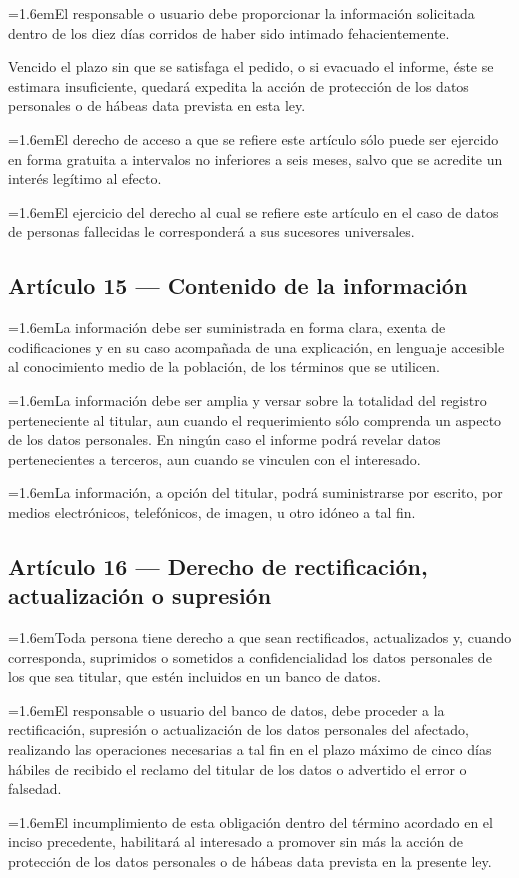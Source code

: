 \documentclass[10pt,a4paper]{article}
\newcommand{\articulo}[1]{\subsection{#1}}
\newcommand{\inciso}[2]{\par{\hangindent=1.6em\hangafter=1\makebox[1.6em][l]{#1}#2\par}}
\begin{document}
\inciso{2.}{El responsable o usuario debe proporcionar la información solicitada dentro de los diez días corridos de haber sido intimado fehacientemente.}

Vencido el plazo sin que se satisfaga el pedido, o si evacuado el informe, éste se estimara insuficiente, quedará expedita la acción de protección de los datos personales o de hábeas data prevista en esta ley.

\inciso{3.}{El derecho de acceso a que se refiere este artículo sólo puede ser ejercido en forma gratuita a intervalos no inferiores a seis meses, salvo que se acredite un interés legítimo al efecto.}

\inciso{4.}{El ejercicio del derecho al cual se refiere este artículo en el caso de datos de personas fallecidas le corresponderá a sus sucesores universales.}

\articulo{Artículo 15 --- Contenido de la información}
\inciso{1.}{La información debe ser suministrada en forma clara, exenta de codificaciones y en su caso acompañada de una explicación, en lenguaje accesible al conocimiento medio de la población, de los términos que se utilicen.}

\inciso{2.}{La información debe ser amplia y versar sobre la totalidad del registro perteneciente al titular, aun cuando el requerimiento sólo comprenda un aspecto de los datos personales. En ningún caso el informe podrá revelar datos pertenecientes a terceros, aun cuando se vinculen con el interesado.}

\inciso{3.}{La información, a opción del titular, podrá suministrarse por escrito, por medios electrónicos, telefónicos, de imagen, u otro idóneo a tal fin.}

\articulo{Artículo 16 --- Derecho de rectificación, actualización o supresión}
\inciso{1.}{Toda persona tiene derecho a que sean rectificados, actualizados y, cuando corresponda, suprimidos o sometidos a confidencialidad los datos personales de los que sea titular, que estén incluidos en un banco de datos.}

\inciso{2.}{El responsable o usuario del banco de datos, debe proceder a la rectificación, supresión o actualización de los datos personales del afectado, realizando las operaciones necesarias a tal fin en el plazo máximo de cinco días hábiles de recibido el reclamo del titular de los datos o advertido el error o falsedad.}

\inciso{3.}{El incumplimiento de esta obligación dentro del término acordado en el inciso precedente, habilitará al interesado a promover sin más la acción de protección de los datos personales o de hábeas data prevista en la presente ley.}
\end{document}
